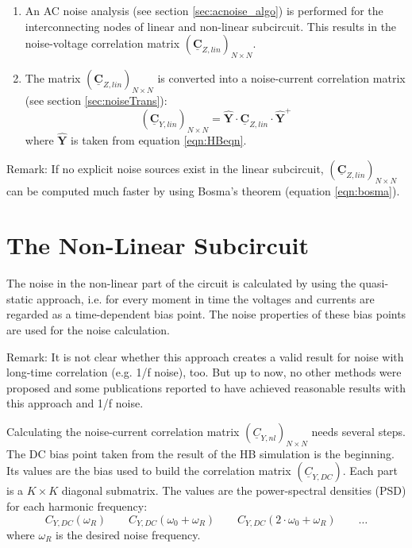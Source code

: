 \begin{enumerate}
\item An AC noise analysis (see section \ref{sec:acnoise_algo}) is
   performed for the interconnecting nodes of linear and non-linear
   subcircuit. This results in the noise-voltage correlation matrix
   $(\boldsymbol{\underline{C}}_{Z,lin})_{N\times N}$.
\item The matrix $(\boldsymbol{\underline{C}}_{Z,lin})_{N\times N}$
   is converted into a noise-current correlation matrix (see section
   \ref{sec:noiseTrans}):
   \begin{equation}
     (\boldsymbol{\underline{C}}_{Y,lin})_{N\times N} =
     \boldsymbol{\hat{Y}} \cdot
     \boldsymbol{\underline{C}}_{Z,lin} \cdot
     \boldsymbol{\hat{Y}}^+
   \end{equation}
   where $\boldsymbol{\hat{Y}}$ is taken from equation \ref{eqn:HBeqn}.
\end{enumerate}

Remark: If no explicit noise sources exist in the linear subcircuit,
$(\boldsymbol{\underline{C}}_{Z,lin})_{N\times N}$ can be computed
much faster by using Bosma's theorem (equation \ref{eqn:bosma}).


\section{The Non-Linear Subcircuit}

The noise in the non-linear part of the circuit is calculated
by using the quasi-static approach, i.e. for every moment in
time the voltages and currents are regarded as a time-dependent
bias point. The noise properties of these bias points are
used for the noise calculation.

\addvspace{12pt}

Remark: It is not clear whether this approach creates a valid result
for noise with long-time correlation (e.g. 1/f noise), too. But up
to now, no other methods were proposed and some publications
reported to have achieved reasonable results with this approach
and 1/f noise.

\addvspace{12pt}

Calculating the noise-current correlation matrix $(\underline{C}_{Y,nl})_{N\times N}$
needs several steps. The DC bias point taken from the result of the
HB simulation is the beginning. Its values are the bias used to build
the correlation matrix $(\underline{C}_{Y,DC})$. Each part is a $K\times K$
diagonal submatrix. The values are the power-spectral densities (PSD)
for each harmonic frequency:
\begin{equation}
C_{Y,DC}(\omega_R) \qquad C_{Y,DC}(\omega_0 + \omega_R) \qquad
C_{Y,DC}(2\cdot\omega_0 + \omega_R) \qquad \dots
\end{equation}
where $\omega_R$ is the desired noise frequency.

